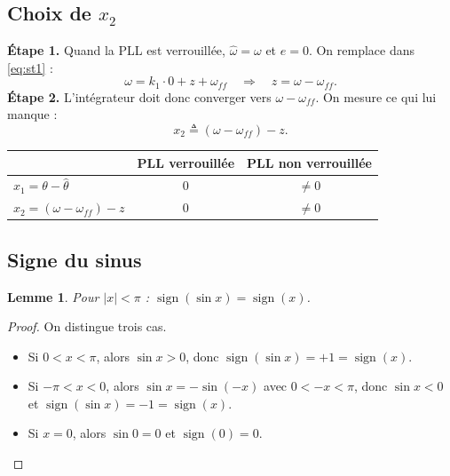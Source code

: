 \documentclass[11pt,a4paper]{article}
\numberwithin{equation}{section}
\theoremstyle{plain}
\newtheorem{lemme}[theoreme]{Lemme}
\theoremstyle{definition}
\theoremstyle{remark}
\newcommand{\sign}{\operatorname{sign}}
\newcommand{\hth}{\hat{\theta}}
\newcommand{\hw}{\hat{\omega}}
\newcommand{\wff}{\omega_{ff}}
\begin{document}
\subsection{Choix de $x_2$}
\textbf{Étape 1.} Quand la PLL est verrouillée, $\hw=\omega$ et $e=0$. On remplace dans \eqref{eq:st1} :
\begin{equation}
\omega = k_1\cdot 0 + z + \wff \quad\Longrightarrow\quad z = \omega-\wff .
\end{equation}
\textbf{Étape 2.} L'intégrateur doit donc converger vers $\omega-\wff$. On mesure ce qui lui manque :
\begin{equation}
\boxed{x_2 \triangleq (\omega-\wff)-z .}
\end{equation}

\begin{center}
\begin{tabular}{lcc}
\hline
 & PLL verrouillée & PLL non verrouillée\\
\hline
$x_1=\theta-\hth$ & $0$ & $\neq0$\\
$x_2=(\omega-\wff)-z$ & $0$ & $\neq0$\\
\hline
\end{tabular}
\end{center}

\subsection{Signe du sinus}
\begin{lemme}\label{lem:signe}
Pour $|x|<\pi$ : $\sign(\sin x)=\sign(x)$.
\end{lemme}
\begin{proof}
On distingue trois cas.
\begin{itemize}
  \item Si $0<x<\pi$, alors $\sin x>0$, donc $\sign(\sin x)=+1=\sign(x)$.
  \item Si $-\pi<x<0$, alors $\sin x = -\sin(-x)$ avec $0<-x<\pi$, donc $\sin x<0$ et $\sign(\sin x)=-1=\sign(x)$.
  \item Si $x=0$, alors $\sin 0=0$ et $\sign(0)=0$.
\end{itemize}
\end{proof}
\end{document}
